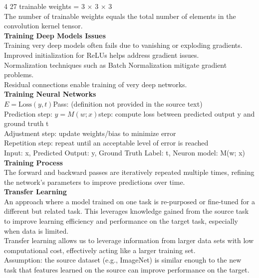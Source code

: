 \documentclass[8pt]{extarticle}
\begin{document}
\begin{multicols}{4}
{27 trainable weights = 3 $\times$ 3 $\times$ 3\\
The number of trainable weights equals the total number of elements in the convolution kernel tensor.\\
\vspace{2pt}\textbf{Training Deep Models Issues}\\
Training very deep models often fails due to vanishing or exploding gradients.\\
Improved initialization for ReLUs helps address gradient issues.\\
Normalization techniques such as Batch Normalization mitigate gradient problems.\\
Residual connections enable training of very deep networks.\\
\vspace{2pt}\textbf{Training Neural Networks}\\
$E = \text{Loss}(y, t)$\Forward Pass: (definition not provided in the source text)\\
Prediction step: $y = M(w; x)$\Comparison step: compute loss between predicted output y and ground truth t\\
Adjustment step: update weights/bias to minimize error\\
Repetition step: repeat until an acceptable level of error is reached\\
Input: x, Predicted Output: y, Ground Truth Label: t, Neuron model: M(w; x)\\
\vspace{2pt}\textbf{Training Process}\\
The forward and backward passes are iteratively repeated multiple times, refining the network's parameters to improve predictions over time.\\
\vspace{2pt}\textbf{Transfer Learning}\\
An approach where a model trained on one task is re-purposed or fine-tuned for a different but related task. This leverages knowledge gained from the source task to improve learning efficiency and performance on the target task, especially when data is limited.\\
Transfer learning allows us to leverage information from larger data sets with low computational cost, effectively acting like a larger training set.\\
Assumption: the source dataset (e.g., ImageNet) is similar enough to the new task that features learned on the source can improve performance on the target.\\
}
\end{multicols}
\end{document}
